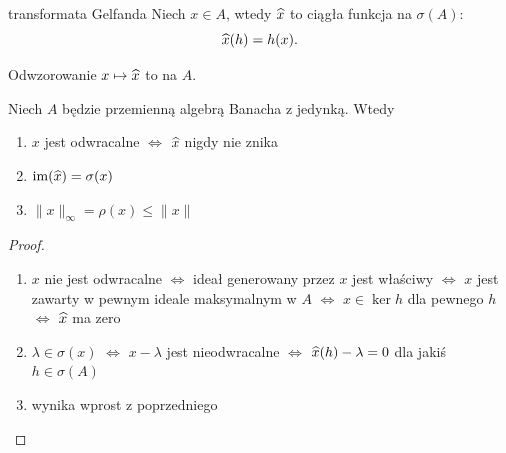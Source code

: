 \begin{definition}{transformata Gelfanda}{}
  Niech $x\in A$, wtedy $\Hat{x}$ to ciągła funkcja na $\sigma(A)$:
  $$\Hat{x}(h)=h(x).$$

  Odwzorowanie $x\mapsto \Hat{x}$ to  na $A$.
\end{definition}

\begin{theorem}{}{}
  Niech $A$ będzie przemienną algebrą Banacha z jedynką. Wtedy 
  \begin{enumerate}
    \item $x$ jest odwracalne $\iff$ $\Hat{x}$ nigdy nie znika
    \item $\im(\Hat{x})=\sigma(x)$
    \item $\|x\|_\infty=\rho(x)\leq\|x\|$
  \end{enumerate}
\end{theorem}

\begin{proof}
  \begin{enumerate}
    \item $x$ nie jest odwracalne $\iff$ ideał generowany przez $x$ jest właściwy $\iff$ $x$ jest zawarty w pewnym ideale maksymalnym w $A$ $\iff$ $x\in \ker h$ dla pewnego $h$ $\iff$ $\Hat{x}$ ma zero
    \item $\lambda \in\sigma(x)$ $\iff$ $x-\lambda$ jest nieodwracalne $\iff$ $\Hat{x}(h)-\lambda=0$ dla jakiś $h\in \sigma(A)$
    \item \color{red}wynika wprost z poprzedniego
  \end{enumerate}
\end{proof}









